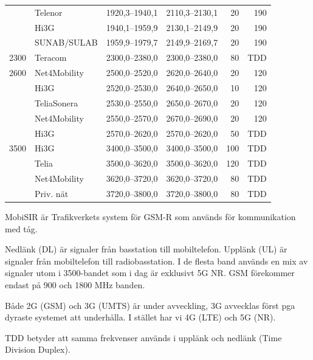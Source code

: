 \begin{longtable}{rlrrrr}
        & Telenor         & 1920,3--1940,1 & 2110,3--2130,1 & 20  & 190 \\
        & Hi3G            & 1940,1--1959,9 & 2130,1--2149,9 & 20  & 190 \\
        & SUNAB/SULAB     & 1959,9--1979,7 & 2149,9--2169,7 & 20  & 190 \\ \hline
2300 	& Teracom	  & 2300,0--2380,0 & 2300,0--2380,0 & 80  & TDD \\ \hline
2600    & Net4Mobility    & 2500,0--2520,0 & 2620,0--2640,0 & 20  & 120 \\
        & Hi3G            & 2520,0--2530,0 & 2640,0--2650,0 & 10  & 120 \\
        & TeliaSonera     & 2530,0--2550,0 & 2650,0--2670,0 & 20  & 120 \\
        & Net4Mobility    & 2550,0--2570,0 & 2670,0--2690,0 & 20  & 120 \\
        & Hi3G            & 2570,0--2620,0 & 2570,0--2620,0 & 50  & TDD \\ \hline
3500    & Hi3G            & 3400,0--3500,0 & 3400,0--3500,0 & 100 & TDD \\
        & Telia           & 3500,0--3620,0 & 3500,0--3620,0 & 120 & TDD \\
        & Net4Mobility    & 3620,0--3720,0 & 3620,0--3720,0 & 80  & TDD \\
        & Priv. nät       & 3720,0--3800,0 & 3720,0--3800,0 & 80  & TDD \\ \hline
\end{longtable}

MobiSIR är Trafikverkets system för GSM-R som används för
kommunikation med tåg.

Nedlänk (DL) är signaler från basstation till mobiltelefon. Upplänk
(UL) är signaler från mobiltelefon till radiobasstation. I de flesta
band används en mix av signaler utom i 3500-bandet som i dag är
exklusivt 5G NR. GSM förekommer endast på 900 och 1800 MHz banden.

Både 2G (GSM) och 3G (UMTS) är under avveckling, 3G avvecklas först
pga dyraste systemet att underhålla. I stället har vi 4G (LTE) och 5G
(NR).

TDD betyder att samma frekvenser används i upplänk och nedlänk (Time
Division Duplex).





